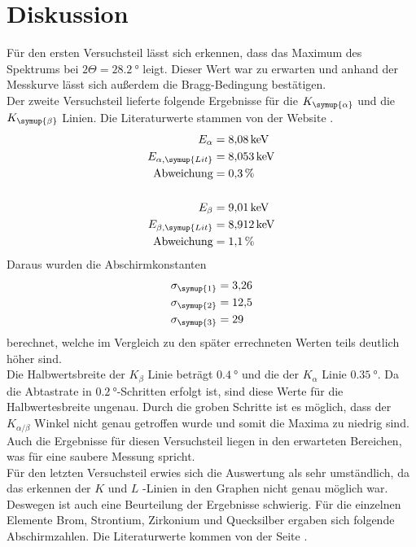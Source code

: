 \section{Diskussion}
\label{sec:Diskussion}

Für den ersten Versuchsteil lässt sich erkennen, dass das Maximum des Spektrums
bei $2 \Theta = \SI{28.2}{\degree}$ leigt. Dieser Wert war zu erwarten und anhand der
Messkurve lässt sich außerdem die Bragg-Bedingung bestätigen.\\
Der zweite Versuchsteil lieferte folgende Ergebnisse für die $K_\symup{\alpha}$ und
die $K_\symup{\beta}$ Linien. Die Literaturwerte stammen von der Website \cite{alpha}.\\
\begin{align*}
  E_\alpha &= \SI{8.08}{\kilo\eV}\\
  E_{\alpha,\symup{Lit}} &= \SI{8.053}{\kilo\eV}\\
  \text{Abweichung} &= \SI{0.3}{\percent}\\\\
  E_\beta &= \SI{9.01}{\kilo\eV}\\
  E_{\beta,\symup{Lit}} &= \SI{8.912}{\kilo\eV}\\
  \text{Abweichung} &= \SI{1.1}{\percent}\\
\end{align*}
Daraus wurden die Abschirmkonstanten
\begin{align*}
  \sigma_\symup{1} &= \num{3.26} \\
  \sigma_\symup{2} &= \num{12.5} \\
  \sigma_\symup{3} &= \num{29} 
\end{align*}
berechnet, welche im Vergleich zu den später errechneten Werten teils deutlich höher sind. \\
Die Halbwertsbreite der $K_\beta$ Linie beträgt $\SI{0.4}{\degree}$ und die der
$K_\alpha$ Linie $\SI{0.35}{\degree}$. Da die Abtastrate in $\SI{0.2}{\degree}$-Schritten erfolgt
ist, sind diese Werte für die Halbwertesbreite ungenau. Durch die groben Schritte ist es möglich,
dass der
$K_{\alpha/\beta}$ Winkel nicht genau getroffen wurde und somit die Maxima zu niedrig sind.\\
Auch die Ergebnisse für diesen Versuchsteil liegen in den erwarteten Bereichen,
was für eine saubere Messung spricht.\\
Für den letzten Versuchsteil erwies sich die Auswertung als sehr umständlich, da
das erkennen der $K$ und $L$ -Linien in den Graphen nicht genau möglich war. Deswegen
ist auch eine Beurteilung der Ergebnisse schwierig. Für die einzelnen
Elemente Brom, Strontium, Zirkonium und Quecksilber ergaben sich folgende
Abschirmzahlen. Die Literaturwerte kommen von der Seite \cite{k_edge}.

